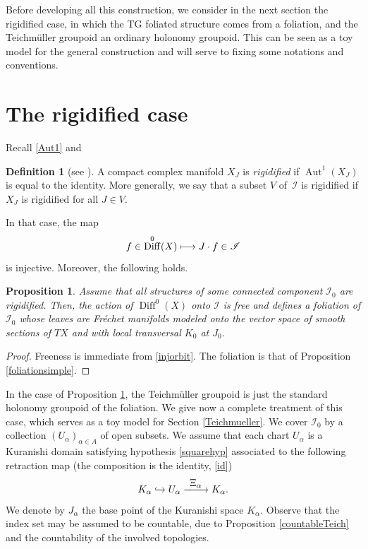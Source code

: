 \documentclass[10pt]{amsart}
\let\mathcal\mathscr
\def\mto{\mathchoice{\longmapsto}{\mapsto}{\mapsto}{\mapsto}}
\def\hto{\mathrel{\lhook\joinrel\to}}
\def\To#1{\mathchoice{\xrightarrow{\textstyle\kern4pt#1\kern3pt}}{\stackrel{#1}{\longrightarrow}}{}{}}
\DeclareMathOperator{\Aut}{Aut}
\DeclareMathOperator{\Diff}{Diff}
\theoremstyle{plain}
\newtheorem{proposition}[theorem]{Proposition}
\theoremstyle{definition}
\newtheorem{definition}[theorem]{Definition}
\theoremstyle{remark}
\numberwithin{equation}{section}
\newcommand{\cI}{\mathcal{I}}
\begin{document}
Before developing all this construction, we consider in the next section the rigidified case, in which the TG foliated structure comes from a foliation, and the Teichmüller groupoid an ordinary holonomy groupoid. This can be seen as a toy model for the general construction and will serve to fixing some notations and conventions.

\section{The rigidified case}
\label{rigidified}

Recall \eqref{Aut1} and

\begin{definition}[see {\cite[Def.\,12]{Catsurvey}}]
\label{rig}
A compact complex manifold $X_J$ is \emph{rigidified} if $\Aut^1(X_J)$ is equal to the identity. More generally, we say that a subset $V$ of~$\cI$ is rigidified if $X_J$ is rigidified for all $J\in V$.
\end{definition}

In that case, the map
\begin{equation}
\label{injorbit}
f\in\Diff^0(X)\mto J\cdot f\in\cI
\end{equation}
is injective. Moreover, the following holds.

\begin{proposition}
\label{rigidconsequences}
Assume that all structures of some connected component $\cI_0$ are rigidified. Then, the action of $\Diff^0(X)$ onto $\cI$ is free and defines a foliation of $\cI_0$ whose leaves are Fréchet manifolds modeled onto the vector space of smooth sections of $TX$ and with local transversal $K_0$ at $J_0$.
\end{proposition}

\begin{proof}
Freeness is immediate from \eqref{injorbit}. The foliation is that of Proposition \ref{foliationsimple}.
\end{proof}

In the case of Proposition \ref{rigidconsequences}, the Teichmüller groupoid is just the standard holonomy groupoid of the foliation. We give now a complete treatment of this case, which serves as a toy model for Section \ref{Teichmueller}. We cover $\cI_0$ by a collection $(U_\alpha)_{\alpha\in A}$ of open subsets. We assume that each chart $U_{\alpha}$ is a Kuranishi domain satisfying hypothesis \ref{squarehyp} associated to the following retraction map (the composition is the identity, \cf \eqref{id})%
\begin{equation}
\label{id2rigid}
K_{\alpha}\hto U_{\alpha}\To{\Xi_{\alpha}}K_{\alpha}.
\end{equation}
We denote by $J_\alpha$ the base point of the Kuranishi space $K_\alpha$. Observe that the index set may be assumed to be countable, due to Proposition \ref{countableTeich} and the countability of the involved topologies.
\end{document}
